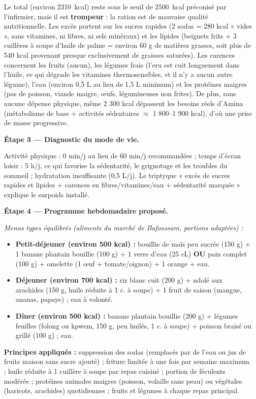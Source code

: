 \documentclass[11pt]{article}
\newcommand{\cle}[1]{{\popxbold\color{popdark}#1}}
\begin{document}
\begin{exoresolu}
Le total (environ \SI{2310}{kcal}) reste sous le seuil de \SI{2500}{kcal} préconisé par l'infirmier, mais il est \textbf{trompeur} : la ration est de \cle{mauvaise qualité nutritionnelle}. Les \cle{excès} portent sur les sucres rapides (2 sodas = 280 kcal « vides », sans vitamines, ni fibres, ni sels minéraux) et les lipides (beignets frits + 3 cuillères à soupe d'huile de palme = environ 60 g de matières grasses, soit plus de 540 kcal provenant presque exclusivement de graisses saturées). Les \cle{carences} concernent les fruits (aucun), les légumes frais (l'eru est cuit longuement dans l'huile, ce qui dégrade les vitamines thermosensibles, et il n'y a aucun autre légume), l'eau (environ 0,5 L au lieu de 1,5 L minimum) et les protéines maigres (pas de poisson, viande maigre, œufs, légumineuses non frites). De plus, sans aucune dépense physique, même 2 300 kcal dépassent les besoins réels d'Amina (métabolisme de base + activités sédentaires $\approx$ 1 800--1 900 kcal), d'où une prise de masse progressive.

\textbf{Étape 3 — Diagnostic du mode de vie.}

Activité physique : 0 min/j au lieu de 60 min/j recommandées ; temps d'écran loisir : 5 h/j, ce qui favorise la sédentarité, le grignotage et les troubles du sommeil ; hydratation insuffisante (0,5 L/j). Le triptyque « excès de sucres rapides et lipides + carences en fibres/vitamines/eau + sédentarité marquée » explique le surpoids installé.

\textbf{Étape 4 — Programme hebdomadaire proposé.}

\emph{Menus types équilibrés (aliments du marché de Bafoussam, portions adaptées) :}
\begin{itemize}
\item \textbf{Petit-déjeuner (environ 500 kcal) :} bouillie de maïs peu sucrée (150 g) + 1 banane plantain bouillie (100 g) + 1 verre d'eau (25 cL) \textbf{OU} pain complet (100 g) + omelette (1 œuf + tomate/oignon) + 1 orange + eau.
\item \textbf{Déjeuner (environ 700 kcal) :} riz blanc cuit (200 g) + ndolé aux arachides (150 g, huile réduite à 1 c. à soupe) + 1 fruit de saison (mangue, ananas, papaye) ; eau à volonté.
\item \textbf{Dîner (environ 500 kcal) :} banane plantain bouillie (200 g) + légumes feuilles (folong ou kpwem, 150 g, peu huilés, 1 c. à soupe) + poisson braisé ou grillé (100 g) ; eau.
\end{itemize}
\textbf{Principes appliqués :} suppression des sodas (remplacés par de l'eau ou jus de fruits maison sans sucre ajouté) ; friture limitée à une fois par semaine maximum ; huile réduite à 1 cuillère à soupe par repas cuisiné ; portion de féculents modérée ; protéines animales maigres (poisson, volaille sans peau) ou végétales (haricots, arachides) quotidiennes ; fruits et légumes à chaque repas principal.


\end{exoresolu}
\end{document}
